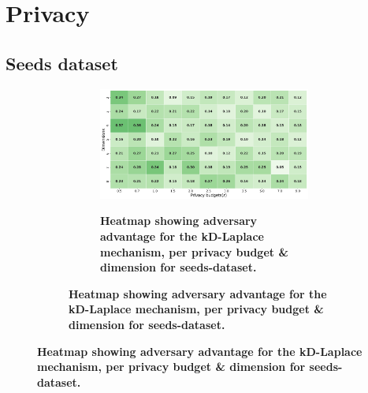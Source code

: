 \section{Privacy}
\subsection{Seeds dataset}
\begin{figure}[H]
    \centering
    \begin{subfigure}[b]{0.85\textwidth}
        \begin{subfigure}[c]{1\textwidth}
            \caption{\textbf{Heatmap showing adversary advantage for the kD-Laplace mechanism, per privacy budget \& dimension for seeds-dataset.}}
            \includegraphics[width=1\textwidth]{Results/kd-laplace/kd-Laplace/seeds-dataset/shokri_mi_adv.png}
            \label{fig:privacy_seeds-dataset_adversial_advantage_kd-laplace}
        \end{subfigure}
        \vfill %


\end{subfigure}
\end{figure}
